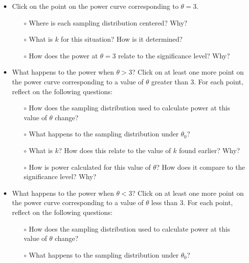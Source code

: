 \documentclass{TISE}
\begin{document}
\begin{enumerate}
	\begin{itemize}
		\item Click on the point on the power curve corresponding to $\theta = 3$. \\ 
		\begin{itemize}
			\item[$\circ$] Where is each sampling distribution centered? Why? \vspace{.5in}
			\item[$\circ$] What is $k$ for this situation? How is it determined? \vspace{.5in}
			\item[$\circ$] How does the power at $\theta = 3$ relate to the significance level? Why? \vspace{.5in}
		\end{itemize}
		\item What happens to the power when $\theta > 3$? Click on at least one more point on the power curve corresponding to a value of $\theta$ greater than 3. For each point, reflect on the following questions: \\
		\begin{itemize}
			\item[$\circ$] How does the sampling distribution used to calculate power at this value of $\theta$ change? \vspace{.5in}
			\item[$\circ$] What happens to the sampling distribution under $\theta_0$? \vspace{.5in}
			\item[$\circ$] What is $k$? How does this relate to the value of $k$ found earlier? Why? \vspace{.5in}
			\item[$\circ$] How is power calculated for this value of $\theta$? How does it compare to the significance level? Why? \vspace{.5in}
		\end{itemize}
		\item What happens to the power when $\theta < 3$? Click on at least one more point on the power curve corresponding to a value of $\theta$ less than 3. For each point, reflect on the following questions: \\
		\begin{itemize}
			\item[$\circ$] How does the sampling distribution used to calculate power at this value of $\theta$ change? \vspace{.5in}
			\item[$\circ$] What happens to the sampling distribution under $\theta_0$? \vspace{.5in}

\end{itemize}
\end{itemize}
\end{enumerate}
\end{document}
